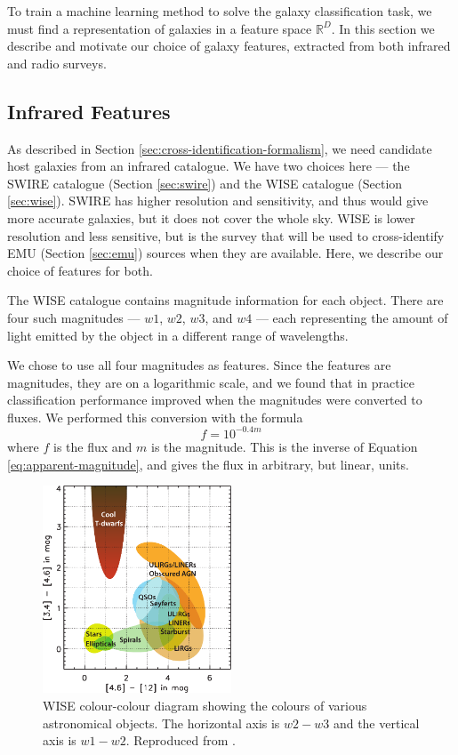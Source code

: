   To train a machine learning method to solve the galaxy classification task,
  we must find a representation of galaxies in a feature space $\mathbb{R}^D$.
  In this section we describe and motivate our choice of galaxy features,
  extracted from both infrared and radio surveys.

  \subsection{Infrared Features}
  \label{sec:ir-features}

    As described in Section \ref{sec:cross-identification-formalism}, we need
    candidate host galaxies from an infrared catalogue. We have two choices here
    --- the SWIRE catalogue (Section \ref{sec:swire}) and the WISE catalogue
    (Section \ref{sec:wise}). SWIRE has higher resolution and sensitivity, and
    thus would give more accurate galaxies, but it does not cover the whole sky.
    WISE is lower resolution and less sensitive, but is the survey that will be
    used to cross-identify EMU (Section \ref{sec:emu}) sources when they are
    available. Here, we describe our choice of features for both.

    The WISE catalogue contains magnitude information for each object. There are
    four such magnitudes --- $w1$, $w2$, $w3$, and $w4$ --- each representing
    the amount of light emitted by the object in a different range of
    wavelengths.

    We chose to use all four magnitudes as features. Since the features are
    magnitudes, they are on a logarithmic scale, and we found that in practice
    classification performance improved when the magnitudes were converted to
    fluxes. We performed this conversion with the formula
    \[
      f = 10^{-0.4m}
    \]
    where $f$ is the flux and $m$ is the magnitude. This is the inverse of
    Equation \ref{eq:apparent-magnitude}, and gives the flux in arbitrary, but
    linear, units.

    \begin{figure}[!ht]
      \centering
      \includegraphics[width=0.5\textwidth]{images/wise_colour-colour}
      \caption{WISE colour-colour diagram showing the colours of various
        astronomical objects. The horizontal axis is $w2 - w3$ and the vertical
        axis is $w1 - w2$. Reproduced from \citep{wright10}.}
      \label{fig:wise-colour-colour}
    \end{figure}

